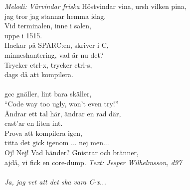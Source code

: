{\footnotesize\textit{Melodi: Vårvindar friska}}
\vspace{10pt}
Höstvindar vina, ursh vilken pina,\\
jag tror jag stannar hemma idag.\\
Vid terminalen, inne i salen,\\
uppe i 1515.\\
Hackar på SPARC:en, skriver i C,\\
minneshantering, vad är nu det?\\
Trycker ctrl-x, trycker ctrl-s,\\
dags då att kompilera.\\
\\
gcc gnäller, lint bara skäller,\\
``Code way too ugly, won't even try!''\\
Ändrar ett tal här, ändrar en rad där,\\
cast'ar en liten int.\\
Prova att kompilera igen,\\
titta det gick igenom ... nej men...\\
Oj! Nej! Vad händer? Gnistrar och bränner,\\
ajdå, vi fick en core-dump.
\vspace{10pt}
{\footnotesize\textit{Text: Jesper Wilhelmsson, d97\\ \\ Ja, jag vet
    att det ska vara C-x...}}
